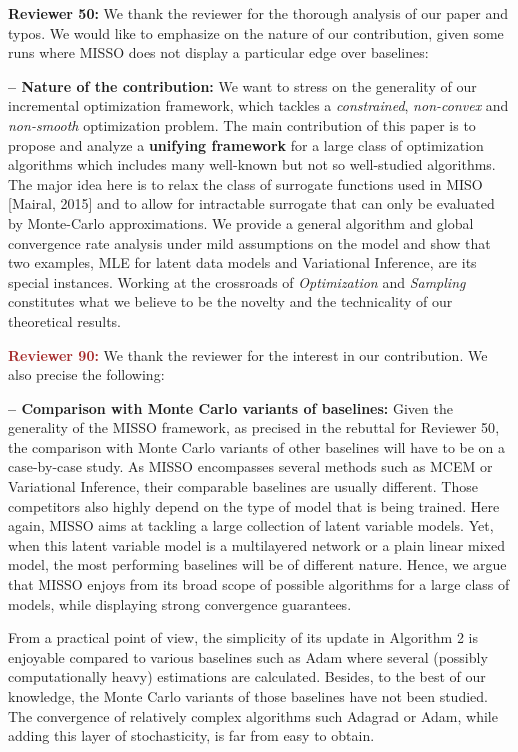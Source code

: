 \documentclass{article}
\begin{document}
\medskip
\textbf{\textcolor{green!50!black}{Reviewer 50:}} We thank the reviewer for the thorough analysis of our paper and typos. 
We would like to emphasize on the nature of our contribution, given some runs where MISSO does not display a particular edge over baselines: 


\vspace{0.03in}
\textbf{-- Nature of the contribution:} 
We want to stress on the generality of our incremental optimization framework, which tackles a \emph{constrained}, \emph{non-convex} and \emph{non-smooth} optimization problem. 
The main contribution of this paper is to propose and analyze a \textbf{unifying framework} for a large class of optimization algorithms which includes many well-known but not so well-studied algorithms.
The major idea here is to relax the class of surrogate functions used in MISO [Mairal, 2015] and to allow for intractable surrogate that can only be evaluated by Monte-Carlo approximations.
We provide a general algorithm and global convergence rate analysis under mild assumptions on the model and show that two examples, MLE for latent data models and Variational Inference, are its special instances.
Working at the crossroads of \emph{Optimization} and \emph{Sampling} constitutes what we believe to be the novelty and the technicality of our theoretical results.


\medskip
\textbf{\textcolor{brown}{Reviewer 90:}} We thank the reviewer for the interest in our contribution. We also precise the following: 

\vspace{0.03in}
\textbf{-- Comparison with Monte Carlo variants of baselines:}
Given the generality of the MISSO framework, as precised in the rebuttal for \textcolor{green!50!black}{Reviewer 50}, the comparison with Monte Carlo variants of other baselines will have to be on a case-by-case study.
As MISSO encompasses several methods such as MCEM or Variational Inference, their comparable baselines are usually different.
Those competitors also highly depend on the type of model that is being trained. 
Here again, MISSO aims at tackling a large collection of latent variable models.
Yet, when this latent variable model is a multilayered network or a plain linear mixed model, the most performing baselines will be of different nature.
Hence, we argue that MISSO enjoys from its broad scope of possible algorithms for a large class of models, while displaying strong convergence guarantees.

From a practical point of view, the simplicity of its update in Algorithm 2 is enjoyable compared to various baselines such as Adam where several (possibly computationally heavy) estimations are calculated.
Besides, to the best of our knowledge, the Monte Carlo variants of those baselines have not been studied.
The convergence of relatively complex algorithms such Adagrad or Adam, while adding this layer of stochasticity, is far from easy to obtain.
\end{document}
